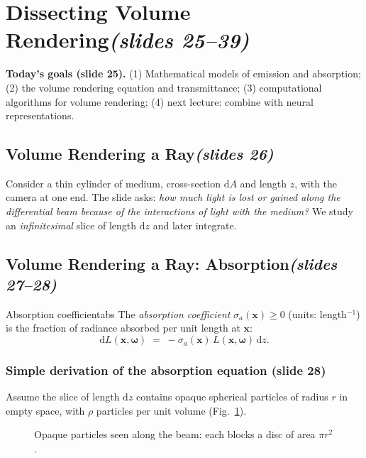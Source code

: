 \documentclass[11pt,a4paper]{article}
\newcommand{\slides}[1]{\texorpdfstring{\hfill{\normalfont\small\emph{(slides #1)}}}{ (slides #1)}}
\newcommand{\x}{\bm{x}}
\newcommand{\w}{\bm{\omega}}
\theoremstyle{remark}\newtheorem*{remark}{Remark}
\begin{document}
\section{Dissecting Volume Rendering\slides{25--39}}
\textbf{Today's goals (slide 25).} (1) Mathematical models of emission and absorption; (2) the volume rendering equation and transmittance; (3) computational algorithms for volume rendering; (4) next lecture: combine with neural representations.

\subsection{Volume Rendering a Ray\slides{26}}

Consider a thin cylinder of medium, cross-section $\mathrm dA$ and length $z$, with the camera at one end. The slide asks: \emph{how much light is lost or gained along the differential beam because of the interactions of light with the medium?} We study an \emph{infinitesimal} slice of length $\mathrm dz$ and later integrate.

\subsection{Volume Rendering a Ray: Absorption\slides{27--28}}

\begin{definition}{Absorption coefficient}{abs}
The \emph{absorption coefficient} $\sigma_a(\x)\ge 0$ (units: length$^{-1}$) is the fraction of radiance absorbed per unit length at $\x$:
\[
\mathrm dL(\x,\w)\;=\;-\sigma_a(\x)\,L(\x,\w)\,\mathrm dz .
\]
\end{definition}

\subsubsection*{Simple derivation of the absorption equation (slide 28)}
Assume the slice of length $\mathrm dz$ contains opaque spherical particles of radius $r$ in empty space, with $\rho$ particles per unit volume (Fig.~\ref{fig:particles}).

\begin{figure}[h]
\centering
{}
\caption{Opaque particles seen along the beam: each blocks a disc of area $\pi r^2$.}\label{fig:particles}
\end{figure}
\end{document}
